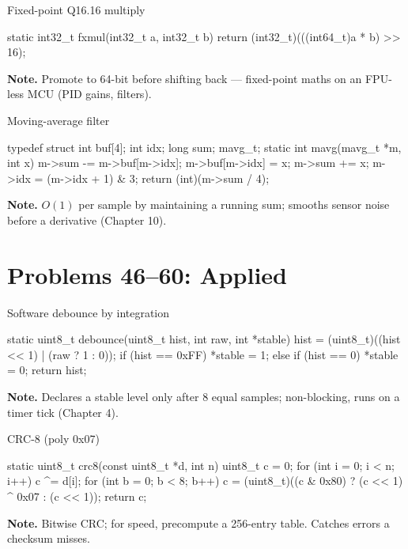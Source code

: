 \begin{gymproblem}{Fixed-point Q16.16 multiply}
\begin{cgym}
static int32_t fxmul(int32_t a, int32_t b) { return (int32_t)(((int64_t)a * b) >> 16); }
\end{cgym}
\textbf{Note.} Promote to 64-bit before shifting back --- fixed-point maths on an
FPU-less MCU (PID gains, filters).
\end{gymproblem}

\begin{gymproblem}{Moving-average filter}
\begin{cgym}
typedef struct { int buf[4]; int idx; long sum; } mavg_t;
static int mavg(mavg_t *m, int x) {
    m->sum -= m->buf[m->idx]; m->buf[m->idx] = x; m->sum += x;
    m->idx = (m->idx + 1) & 3;
    return (int)(m->sum / 4);
}
\end{cgym}
\textbf{Note.} $O(1)$ per sample by maintaining a running sum; smooths sensor
noise before a derivative (Chapter 10).
\end{gymproblem}

\section{Problems 46--60: Applied}
\attempt

\begin{gymproblem}{Software debounce by integration}
\begin{cgym}
static uint8_t debounce(uint8_t hist, int raw, int *stable) {
    hist = (uint8_t)((hist << 1) | (raw ? 1 : 0));
    if (hist == 0xFF) *stable = 1; else if (hist == 0) *stable = 0;
    return hist;
}
\end{cgym}
\textbf{Note.} Declares a stable level only after 8 equal samples; non-blocking,
runs on a timer tick (Chapter 4).
\end{gymproblem}

\begin{gymproblem}{CRC-8 (poly 0x07)}
\begin{cgym}
static uint8_t crc8(const uint8_t *d, int n) {
    uint8_t c = 0;
    for (int i = 0; i < n; i++) {
        c ^= d[i];
        for (int b = 0; b < 8; b++) c = (uint8_t)((c & 0x80) ? (c << 1) ^ 0x07 : (c << 1));
    }
    return c;
}
\end{cgym}
\textbf{Note.} Bitwise CRC; for speed, precompute a 256-entry table. Catches
errors a checksum misses.
\end{gymproblem}

